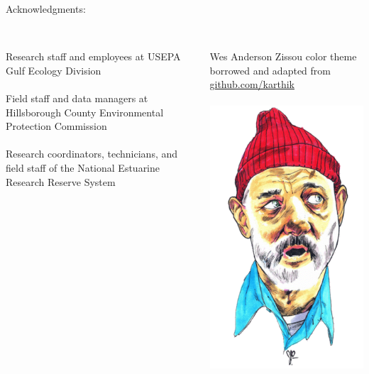 \documentclass[serif]{beamer}\usepackage[]{graphicx}\usepackage[]{color}
\begin{document}
\begin{frame}
Acknowledgments:\\~\\
\begin{columns}
\begin{column}{0.6\textwidth}
{\footnotesize
Research staff and employees at USEPA Gulf Ecology Division \\~\\
Field staff and data managers at Hillsborough County Environmental Protection Commission\\~\\
Research coordinators, technicians, and field staff of the National Estuarine Research Reserve System}\\~\\
\end{column}
\begin{column}{0.3\textwidth}
\vspace{-0.2in}
\begin{center}
{\tiny
Wes Anderson Zissou color theme borrowed and adapted from \href{https://github.com/karthik/wesanderson}{github.com/karthik}\\~\\
\includegraphics[width=0.55\linewidth]{fig/zissou.png}\\~\\
\vspace{-0.15in}
}
\end{center}
\end{column}
\end{columns}
\end{frame}
\end{document}
